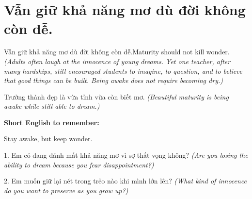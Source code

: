 \section{Vẫn giữ khả năng mơ dù đời không còn dễ.}
\begin{truyen}{Vẫn giữ khả năng mơ dù đời không còn dễ.}{Maturity should not kill wonder.}
\textit{(Adults often laugh at the innocence of young dreams. Yet one teacher, after many hardships, still encouraged students to imagine, to question, and to believe that good things can be built. Being awake does not require becoming dry.)}
\end{truyen}
\begin{baihoc}
Trưởng thành đẹp là vừa tỉnh vừa còn biết mơ.
\textit{(Beautiful maturity is being awake while still able to dream.)}
\end{baihoc}
\begin{ghinhoanh}
\textbf{Short English to remember:}

Stay awake, but keep wonder.
\end{ghinhoanh}
\begin{tuhocnhanh}
1. Em có đang đánh mất khả năng mơ vì sợ thất vọng không? \textit{(Are you losing the ability to dream because you fear disappointment?)}

2. Em muốn giữ lại nét trong trẻo nào khi mình lớn lên? \textit{(What kind of innocence do you want to preserve as you grow up?)}
\end{tuhocnhanh}
\ngancach


